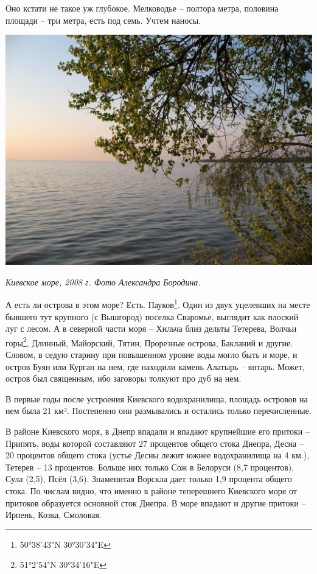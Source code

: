 Оно кстати не такое уж глубокое. Мелководье – полтора метра, половина площади – три метра, есть под семь. Учтем наносы.

\begin{center}
\includegraphics[width=\linewidth]{chast-gorodki/more/s_IMG_0577.jpg}

\textit{Киевское море, 2008 г. Фото Александра Бородина.}
\end{center}

А есть ли острова в этом море? Есть. Пауков\footnote{50°38'43"N 30°30'34"E}. Один из двух уцелевших на месте бывшего тут крупного (с Вышгород) поселка Сваромье, выглядит как плоский луг с лесом. А в северной части моря – Хильча близ дельты Тетерева, Волчьи горы\footnote{51°2'54"N 30°34'16"E}, Длинный, Майорский, Тятин, Прорезные острова, Бакланий и другие. Словом, в седую старину при повышенном уровне воды могло быть и море, и остров Буян или Курган на нем, где находили камень Алатырь – янтарь. Может, остров был священным, ибо заговоры толкуют про дуб на нем.%

В первые годы после устроения Киевского водохранилища, площадь островов на нем была 21 км². Постепенно они размывались и остались только перечисленные.
 
В районе Киевского моря, в Днепр впадали и впадают крупнейшие его притоки – Припять, воды которой составляют 27 процентов общего стока Днепра, Десна – 20 процентов общего стока (устье Десны лежит южнее водохранилища на 4 км.), Тетерев – 13 процентов. Больше них только Сож в Белоруси (8,7 процентов), Сула (2,5), Псёл (3,6). Знаменитая Ворскла дает только 1,9 процента общего стока. По числам видно, что именно в районе теперешнего Киевского моря от притоков образуется основной сток Днепра. В море впадают и другие притоки – Ирпень, Козка, Смоловая.

